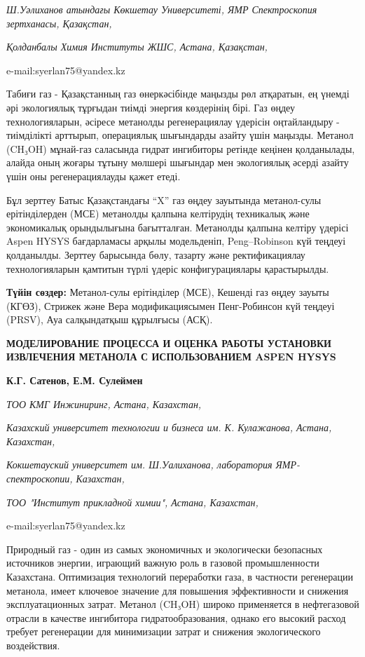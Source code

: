 \emph{Ш.Уәлиханов атындағы Көкшетау Университеті, ЯМР
Спектроскопия зертханасы, Қазақстан,}

\emph{ Қолданбалы Химия Институты ЖШС, Астана,
Қазақстан,}

e-mail:syerlan75@yandex.kz

Табиғи газ - Қазақстанның газ өнеркәсібінде маңызды рөл атқаратын, ең
үнемді әрі экологиялық тұрғыдан тиімді энергия көздерінің бірі. Газ
өңдеу технологияларын, әсіресе метанолды регенерациялау үдерісін
оңтайландыру - тиімділікті арттырып, операциялық шығындарды азайту үшін
маңызды. Метанол (CH₃OH) мұнай-газ саласында гидрат ингибиторы ретінде
кеңінен қолданылады, алайда оның жоғары тұтыну мөлшері шығындар мен
экологиялық әсерді азайту үшін оны регенерациялауды қажет етеді.

Бұл зерттеу Батыс Қазақстандағы ``X'' газ өңдеу зауытында метанол-сулы
ерітінділерден (МСЕ) метанолды қалпына келтірудің техникалық және
экономикалық орындылығына бағытталған. Метанолды қалпына келтіру үдерісі
Aspen HYSYS бағдарламасы арқылы модельденіп, Peng--Robinson күй теңдеуі
қолданылды. Зерттеу барысында бөлу, тазарту және ректификациялау
технологияларын қамтитын түрлі үдеріс конфигурациялары қарастырылды.

{\bfseries Түйін сөздер:} Метанол-сулы ерітінділер (МСЕ), Кешенді газ өңдеу
зауыты (КГӨЗ), Стрижек және Вера модификациясымен Пенг-Робинсон күй
теңдеуі (PRSV), Ауа салқындатқыш құрылғысы (АСҚ).

{\bfseries МОДЕЛИРОВАНИЕ ПРОЦЕССА И ОЦЕНКА РАБОТЫ УСТАНОВКИ ИЗВЛЕЧЕНИЯ
МЕТАНОЛА С ИСПОЛЬЗОВАНИЕМ ASPEN HYSYS}

{\bfseries {}К.Г. Сатенов, Е.М.
Сулеймен\envelope }

\emph{ТОО КМГ Инжиниринг, Астана, Казахстан,}

\emph{Казахский университет технологии и бизнеса им.
К. Кулажанова, Астана, Казахстан,}

\emph{Кокшетауский университет им. Ш.Уалиханова,
лаборатория ЯМР-спектроскопии, Казахстан,}

\emph{ТОО "Институт прикладной химии", Астана,
Казахстан,}

e-mail:syerlan75@yandex.kz

Природный газ - один из самых экономичных и экологически безопасных
источников энергии, играющий важную роль в газовой промышленности
Казахстана. Оптимизация технологий переработки газа, в частности
регенерации метанола, имеет ключевое значение для повышения
эффективности и снижения эксплуатационных затрат. Метанол (CH₃OH) широко
применяется в нефтегазовой отрасли в качестве ингибитора
гидратообразования, однако его высокий расход требует регенерации для
минимизации затрат и снижения экологического воздействия.

